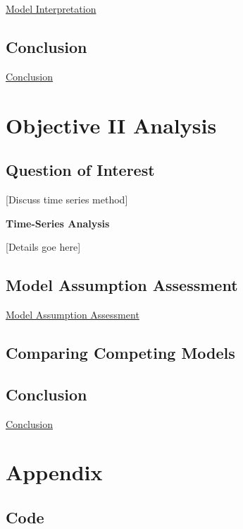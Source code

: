 \documentclass[american,]{article}
\begin{document}
\protect\hyperlink{model-interpretation}{Model Interpretation}

\hypertarget{conclusion}{%
\subsection{Conclusion}\label{conclusion}}

\protect\hyperlink{conclusion-1}{Conclusion}

\newpage

\hypertarget{objective-ii-analysis}{%
\section{Objective II Analysis}\label{objective-ii-analysis}}

\hypertarget{question-of-interest-1}{%
\subsection{Question of Interest}\label{question-of-interest-1}}

{[}Discuss time series method{]}

\textbf{Time-Series Analysis}

{[}Details goe here{]}

\hypertarget{model-assumption-assessment}{%
\subsection{Model Assumption Assessment}\label{model-assumption-assessment}}

\protect\hyperlink{model-assumption-assessment}{Model Assumption Assessment}

\hypertarget{comparing-competing-models-1}{%
\subsection{Comparing Competing Models}\label{comparing-competing-models-1}}

\hypertarget{conclusion-1}{%
\subsection{Conclusion}\label{conclusion-1}}

\protect\hyperlink{conclusion-1}{Conclusion}

\newpage

\hypertarget{appendix}{%
\section{Appendix}\label{appendix}}

\hypertarget{code}{%
\subsection{Code}\label{code}}

\newpage

\renewcommand\refname{References}

\end{document}
